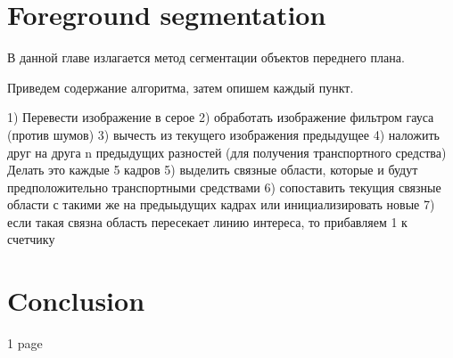 \documentclass[12pt,a4paper,oneside,titlepage]{article}
\begin{document}






































\newpage
\section*{Foreground segmentation}
В данной главе излагается метод сегментации объектов переднего плана.





Приведем содержание алгоритма, затем опишем каждый пункт.

1) Перевести изображение в серое
2) обработать изображение фильтром гауса (против шумов)
3) вычесть из текущего изображения предыдущее
4) наложить друг на друга n предыдущих разностей (для получения транспортного средства) Делать это каждые 5 кадров
5) выделить связные области, которые и будут предположительно транспортными средствами 
6) сопоставить текущия связные области с такими же на предыыдущих кадрах или инициализировать новые
7) если такая связна область пересекает линию интереса, то прибавляем 1 к счетчику



\newpage
\section*{Conclusion}
1 page


\newpage
\renewcommand\refname{Bibliography}


\end{document}
